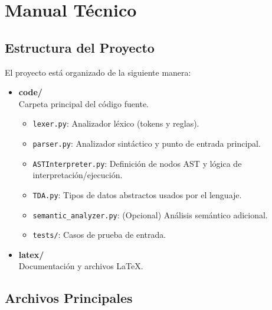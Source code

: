 \documentclass{article}
\begin{document}

\section{Manual Técnico}\label{sec:man_t}

\subsection{Estructura del Proyecto}

El proyecto está organizado de la siguiente manera:

\begin{itemize}
    \item \textbf{code/} \\ Carpeta principal del código fuente.
    \begin{itemize}
        \item \texttt{lexer.py}: Analizador léxico (tokens y reglas).
        \item \texttt{parser.py}: Analizador sintáctico y punto de entrada principal.
        \item \texttt{ASTInterpreter.py}: Definición de nodos AST y lógica de interpretación/ejecución.
        \item \texttt{TDA.py}: Tipos de datos abstractos usados por el lenguaje.
        \item \texttt{semantic\_analyzer.py}: (Opcional) Análisis semántico adicional.
        \item \texttt{tests/}: Casos de prueba de entrada.
    \end{itemize}
    \item \textbf{latex/} \\ Documentación y archivos LaTeX.
\end{itemize}

\subsection{Archivos Principales}
\end{document}
